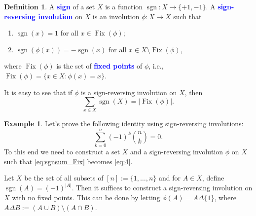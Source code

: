\documentclass{amsart}
\numberwithin{equation}{section}
\theoremstyle{definition}
\newtheorem{exam}[thm]{Example}
\newtheorem{defn}[thm]{Definition}
\newcommand\Fix{\operatorname{Fix}}
\newcommand\sgn{\operatorname{sgn}}
\renewcommand\emph[1]{\textcolor{blue}{\bf #1}}
\begin{document}
\begin{defn}
  A \emph{sign} of a set \( X \) is a function
  \( \sgn:X \to \{+1,-1\} \). A \emph{sign-reversing involution} on
  \( X \) is an involution \( \phi:X\to X \) such that
  \begin{enumerate}
  \item \( \sgn(x)=1 \) for all \( x\in \Fix(\phi) \);
  \item \( \sgn(\phi(x)) = -\sgn(x) \) for all
  \( x\in X \setminus \Fix(\phi) \),
  \end{enumerate}
  where \( \Fix(\phi) \) is the set of \emph{fixed points} of
  \( \phi \), i.e., \( \Fix(\phi) = \{x\in X: \phi(x) = x \} \).
\end{defn}

It is easy to see that if \( \phi \) is a sign-reversing involution on
\( X \), then
\begin{equation}\label{eq:sgnsum=Fix}
  \sum_{x\in X} \sgn(X) = |\Fix(\phi)|.
\end{equation}

\begin{exam}
  Let's prove the following identity using sign-reversing involutions:
  \begin{equation}\label{eq:4}
    \sum_{k=0}^{n} (-1)^{k} \binom{n}{k} = 0.
  \end{equation}
  To this end we need to construct a set \( X \) and a sign-reversing
  involution \( \phi \) on \( X \) such that \eqref{eq:sgnsum=Fix}
  becomes \eqref{eq:4}.

  Let \( X \) be the set of all subsets of \( [n]:= \{ 1,\dots,n \} \)
  and for \( A\in X \), define \( \sgn(A) = (-1)^{|A|} \). Then it
  suffices to construct a sign-reversing involution on \( X \) with no
  fixed points. This can be done by letting
  \( \phi(A) = A \Delta \{1\} \), where
  \( A \Delta B := (A \cup B) \setminus (A \cap B) \).
\end{exam}
\end{document}
